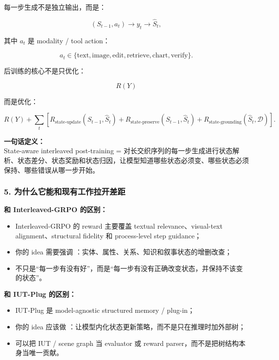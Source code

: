 每一步生成不是独立输出，而是：

\[
(S_{t-1}, a_t)
\rightarrow
y_t
\rightarrow
\hat{S}_t,
\]

其中 $a_t$ 是 modality / tool action：

\[
a_t \in
\{\text{text},\text{image},\text{edit},\text{retrieve},\text{chart},\text{verify}\}.
\]

后训练的核心不是只优化：

\[
R(Y)
\]

而是优化：

\[
R(Y)
+
\sum_t
\left[
R_\text{state-update}(S_{t-1},\hat{S}_t)
+
R_\text{state-preserve}(S_{t-1},\hat{S}_t)
+
R_\text{state-grounding}(\hat{S}_t,\mathcal{D})
\right].
\]

\begin{summarybox}
\textbf{一句话定义：}\\
State-aware interleaved post-training = 对长交织序列的每一步生成进行状态解析、状态差分、状态奖励和状态归因，让模型知道哪些状态必须变、哪些状态必须保持、哪些错误从哪一步开始。
\end{summarybox}

\subsubsection*{5. 为什么它能和现有工作拉开差距}

\textbf{和 Interleaved-GRPO 的区别：}

\begin{itemize}[leftmargin=1.5em]
  \item Interleaved-GRPO 的 reward 主要覆盖 textual relevance、visual-text alignment、structural fidelity 和 process-level step guidance；
  \item 你的 idea 需要强调 ：实体、属性、关系、知识和叙事状态的增删改查；
  \item 不只是“每一步有没有好”，而是“每一步有没有正确改变状态，并保持不该变的状态”。
\end{itemize}

\textbf{和 IUT-Plug 的区别：}

\begin{itemize}[leftmargin=1.5em]
  \item IUT-Plug 是 model-agnostic structured memory / plug-in；
  \item 你的 idea 应该做 ：让模型内化状态更新策略，而不是只在推理时加外部树；
  \item 可以把 IUT / scene graph 当 evaluator 或 reward parser，而不是把树结构本身当唯一贡献。
\end{itemize}

